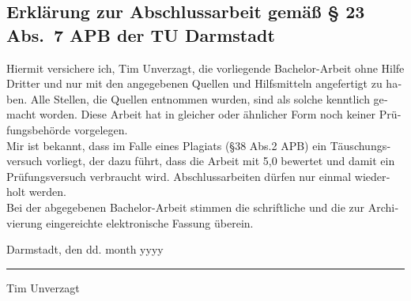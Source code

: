 \documentclass[longdoc,accentcolor=tud1b,11pt,paper=a4]{tudreport}
\title{\komTitle}
\subtitle{\komTitleTranslation \\ \komThesisType}
\newcommand{\komThesisType}{Bachelor-Arbeit\xspace}
\newcommand{\komName}{Tim Unverzagt\xspace}
\newcommand{\komSubmissionDate}{dd. month yyyy\xspace}%
\begin{document}
	
	\frenchspacing
	\raggedbottom
	\maketitle
	

    \begin{otherlanguage}{ngerman}
    \chapter*{Erklärung zur Abschlussarbeit gemäß § 23 Abs.\ 7 APB der TU Darmstadt}
    Hiermit versichere ich, \komName, die vorliegende \komThesisType ohne Hilfe Dritter und nur mit den angegebenen Quellen und Hilfsmitteln angefertigt zu haben. 
    Alle Stellen, die Quellen entnommen wurden, sind als solche kenntlich gemacht worden. 
    Diese Arbeit hat in gleicher oder ähnlicher Form noch keiner Prüfungsbehörde vorgelegen.\\

    \noindent Mir ist bekannt, dass im Falle eines Plagiats (§38 Abs.2 APB) ein Täuschungsversuch vorliegt, der dazu führt, dass die Arbeit mit 5,0 bewertet und damit ein Prüfungsversuch verbraucht wird. 
    Abschlussarbeiten dürfen nur einmal wiederholt werden.\\

    \noindent Bei der abgegebenen \komThesisType stimmen die schriftliche und die zur Archivierung eingereichte elektronische Fassung überein. 
    
    \vspace{4em}
    
    \noindent Darmstadt, den \komSubmissionDate 
    
    \vspace{3em}
    
    \noindent\rule{5cm}{0.4pt}
    
    \noindent\komName
    
    \end{otherlanguage}
    

\end{document}
